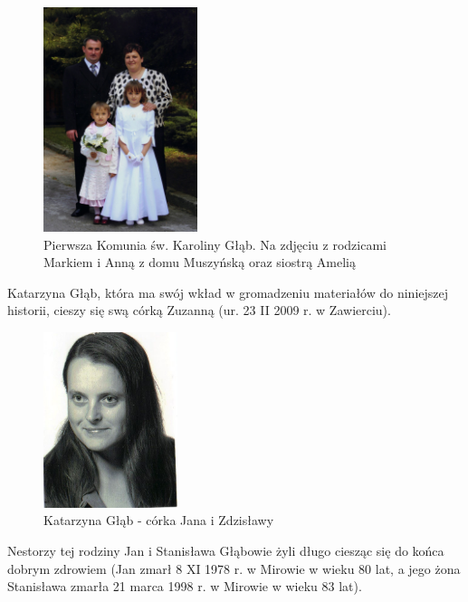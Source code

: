 \begin{figure}[!h]
\begin{center}
\includegraphics[width=0.4\textwidth]{zdjecia/marek_i_anna_glab_z_corkami.jpg}
\caption[Pierwsza Komunia św. Karoliny Głąb]{Pierwsza Komunia św. Karoliny Głąb. Na zdjęciu z rodzicami Markiem i Anną z domu Muszyńską oraz siostrą Amelią}
\label{rys:marek_i_anna_glab_z_corkami}
\end{center}
\end{figure}

Katarzyna Głąb, która ma swój wkład w gromadzeniu materiałów do niniejszej historii, cieszy się swą córką Zuzanną (ur. 23 II 2009 r. w Zawierciu).

\begin{figure}[!h]
\begin{center}
\includegraphics[width=0.35\textwidth]{zdjecia/katarzyna_glab.jpg}
\caption[Katarzyna Głąb]{Katarzyna Głąb - córka Jana i Zdzisławy}
\label{rys:katarzyna_glab}
\end{center}
\end{figure}

Nestorzy tej rodziny Jan i Stanisława Głąbowie żyli długo ciesząc się do końca dobrym zdrowiem (Jan zmarł 8 XI 1978 r. w Mirowie w wieku 80 lat, a jego żona Stanisława zmarła 21 marca 1998 r. w Mirowie w wieku 83 lat).

